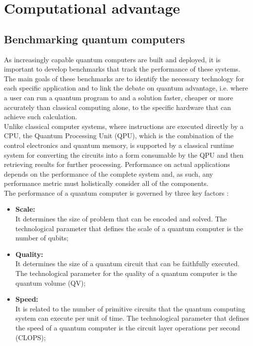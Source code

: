 \chapter{Computational advantage} \label{Computational advantage}

\section{Benchmarking quantum computers}
As increasingly capable quantum computers are built and deployed, it is important to develop benchmarks that track the performance of these systems. The main goals of these benchmarks are to identify the necessary technology for each specific application and to link the debate on quantum advantage, i.e. where a user can run a quantum program to and a solution faster, cheaper or more accurately than classical computing alone, to the specific hardware that can achieve such calculation. \\
Unlike classical computer systems, where instructions are executed directly by a CPU, the Quantum Processing Unit (QPU), which is the combination of the control electronics and quantum memory, is supported by a classical runtime system for converting the circuits into a form consumable by the QPU and then retrieving results for further processing. Performance on actual applications depends on the performance of the complete system and, as such, any performance metric must holistically consider all of the components. \\
The performance of a quantum computer is governed by three key factors \cite{Wack2021Oct}:
\begin{itemize}
    \item \textbf{Scale:} \\
    It determines the size of problem that can be encoded and solved. The technological parameter that defines the scale of a quantum computer is the number of qubits;
    
    \item \textbf{Quality:} \\
    It determines the size of a quantum circuit that can be faithfully executed. The technological parameter for the quality of a quantum computer is the quantum volume (QV);
    
    \item \textbf{Speed:} \\
    It is related to the number of primitive circuits that the quantum computing system can execute per unit of time. The technological parameter that defines the speed of a quantum computer is the circuit layer operations per second (CLOPS);
\end{itemize}

